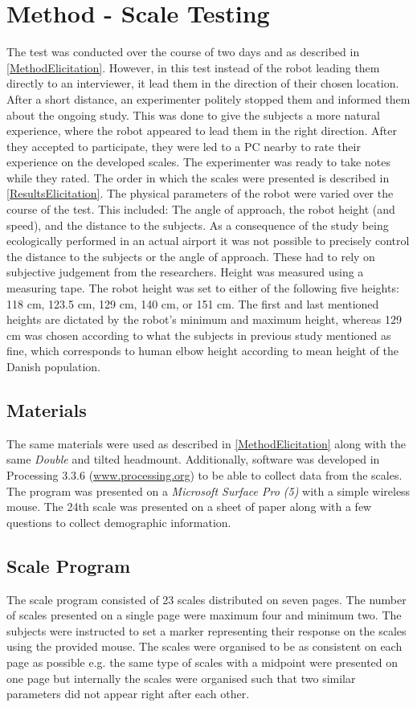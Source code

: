 \section{Method - Scale Testing}
\label{Method2}
The test was conducted over the course of two days and as described in \autoref{MethodElicitation}. However, in this test instead of the robot leading them directly to an interviewer, it lead them in the direction of their chosen location. After a short distance, an experimenter politely stopped them and informed them about the ongoing study. This was done to give the subjects a more natural experience, where the robot appeared to lead them in the right direction. After they accepted to participate, they were led to a PC nearby to rate their experience on the developed scales. The experimenter was ready to take notes while they rated. The order in which the scales were presented is described in \autoref{ResultsElicitation}. The physical parameters of the robot were varied over the course of the test. This included: The angle of approach, the robot height (and speed), and the distance to the subjects. As a consequence of the study being ecologically performed in an actual airport it was not possible to precisely control the distance to the subjects or the angle of approach. These had to rely on subjective judgement from the researchers. Height was measured using a measuring tape. The robot height was set to either of the following five heights: 118 cm, 123.5 cm, 129 cm, 140 cm, or 151 cm. The first and last mentioned heights are dictated by the robot's minimum and maximum height, whereas 129 cm was chosen according to what the subjects in previous study mentioned as fine, which corresponds to human elbow height according to mean height of the Danish population. 

\subsection{Materials}
The same materials were used as described in \autoref{MethodElicitation} along with the same \textit{Double} and tilted headmount. Additionally, software was developed in Processing 3.3.6 (\url{www.processing.org}) to be able to collect data from the scales. The program was presented on a \textit{Microsoft Surface Pro (5)} with a simple wireless mouse. The 24th scale was presented on a sheet of paper along with a few questions to collect demographic information.

\subsection{Scale Program}
The scale program consisted of 23 scales distributed on seven pages. The number of scales presented on a single page were maximum four and minimum two. The subjects were instructed to set a marker representing their response on the scales using the provided mouse. The scales were organised to be as consistent on each page as possible e.g. the same type of scales with a midpoint were presented on one page but internally the scales were organised such that two similar parameters did not appear right after each other.

